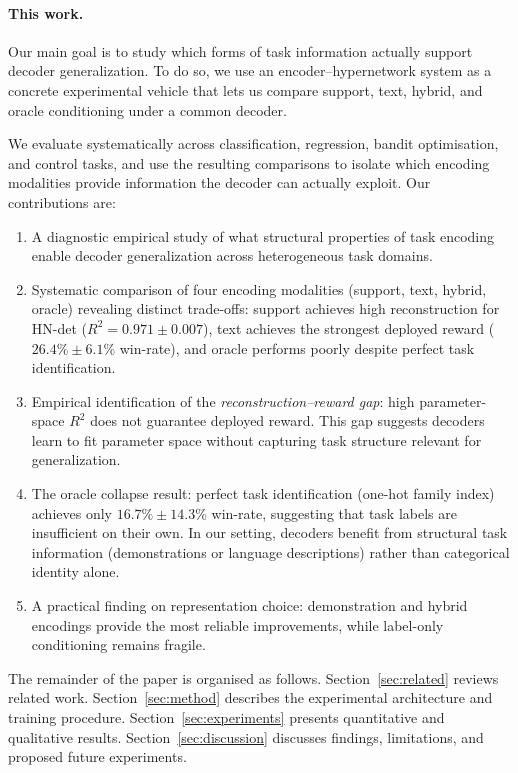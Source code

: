 \paragraph{This work.}
Our main goal is to study which forms of task information actually support decoder generalization.
To do so, we use an encoder--hypernetwork system as a concrete experimental vehicle that lets us compare support, text, hybrid, and oracle conditioning under a common decoder.

We evaluate systematically across classification, regression, bandit optimisation, and control tasks, and use the resulting comparisons to isolate which encoding modalities provide information the decoder can actually exploit.
Our contributions are:
\begin{enumerate}
  \item A diagnostic empirical study of what structural properties of task encoding enable decoder generalization across heterogeneous task domains.
  \item Systematic comparison of four encoding modalities (support, text, hybrid, oracle) revealing distinct trade-offs: support achieves high reconstruction for HN-det ($R^2 = 0.971 \pm 0.007$), text achieves the strongest deployed reward ($26.4\%\pm6.1\%$ win-rate), and oracle performs poorly despite perfect task identification.
  \item Empirical identification of the \emph{reconstruction--reward gap}: high parameter-space $R^2$ does not guarantee deployed reward. This gap suggests decoders learn to fit parameter space without capturing task structure relevant for generalization.
  \item The oracle collapse result: perfect task identification (one-hot family index) achieves only $16.7\%\pm14.3\%$ win-rate, suggesting that task labels are insufficient on their own. In our setting, decoders benefit from structural task information (demonstrations or language descriptions) rather than categorical identity alone.
  \item A practical finding on representation choice: demonstration and hybrid encodings provide the most reliable improvements, while label-only conditioning remains fragile.
\end{enumerate}

The remainder of the paper is organised as follows.
Section~\ref{sec:related} reviews related work.
Section~\ref{sec:method} describes the experimental architecture and training procedure.
Section~\ref{sec:experiments} presents quantitative and qualitative results.
Section~\ref{sec:discussion} discusses findings, limitations, and proposed future experiments.
